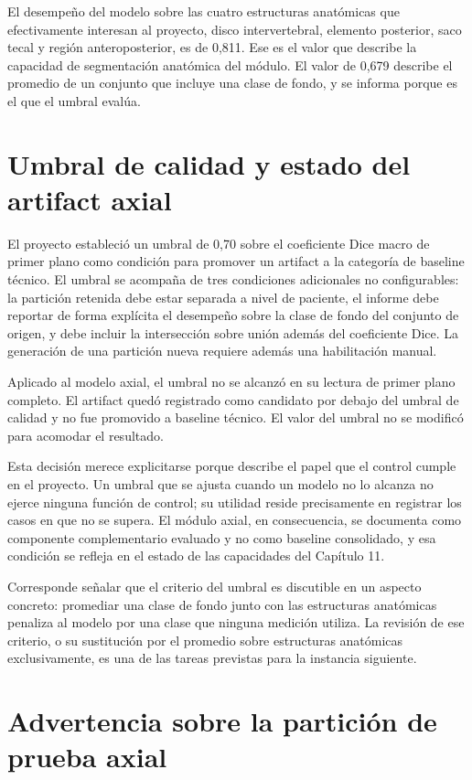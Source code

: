 El desempeño del modelo sobre las cuatro estructuras anatómicas que efectivamente interesan al proyecto, disco intervertebral, elemento posterior, saco tecal y región anteroposterior, es de 0,811. Ese es el valor que describe la capacidad de segmentación anatómica del módulo. El valor de 0,679 describe el promedio de un conjunto que incluye una clase de fondo, y se informa porque es el que el umbral evalúa.

\section{Umbral de calidad y estado del artifact axial}

El proyecto estableció un umbral de 0,70 sobre el coeficiente Dice macro de primer plano como condición para promover un artifact a la categoría de baseline técnico. El umbral se acompaña de tres condiciones adicionales no configurables: la partición retenida debe estar separada a nivel de paciente, el informe debe reportar de forma explícita el desempeño sobre la clase de fondo del conjunto de origen, y debe incluir la intersección sobre unión además del coeficiente Dice. La generación de una partición nueva requiere además una habilitación manual.

Aplicado al modelo axial, el umbral no se alcanzó en su lectura de primer plano completo. El artifact quedó registrado como candidato por debajo del umbral de calidad y no fue promovido a baseline técnico. El valor del umbral no se modificó para acomodar el resultado.

Esta decisión merece explicitarse porque describe el papel que el control cumple en el proyecto. Un umbral que se ajusta cuando un modelo no lo alcanza no ejerce ninguna función de control; su utilidad reside precisamente en registrar los casos en que no se supera. El módulo axial, en consecuencia, se documenta como componente complementario evaluado y no como baseline consolidado, y esa condición se refleja en el estado de las capacidades del Capítulo 11.

Corresponde señalar que el criterio del umbral es discutible en un aspecto concreto: promediar una clase de fondo junto con las estructuras anatómicas penaliza al modelo por una clase que ninguna medición utiliza. La revisión de ese criterio, o su sustitución por el promedio sobre estructuras anatómicas exclusivamente, es una de las tareas previstas para la instancia siguiente.

\section{Advertencia sobre la partición de prueba axial}

